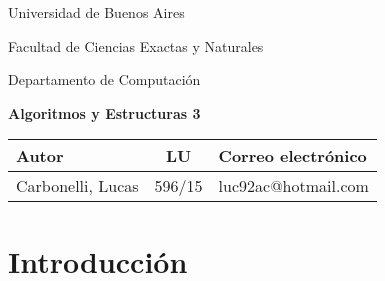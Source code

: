 \documentclass{article}
\begin{document}
\begin{titlepage}
	\centering
	\vspace{1cm}
	{\normalfont\huge Universidad de Buenos Aires \par}
	\vspace{1cm}
	{\normalfont\Large Facultad de Ciencias Exactas y Naturales\par}
	{\normalfont\Large Departamento de Computación\par}
	\vspace{1.5cm}
	{\bfseries\huge Algoritmos y Estructuras 3 \par}
	\vspace{1.5cm}
	{\normalfont\huge  \par}
	\vspace{1.5cm}
	
	{\large
		\begin{tabular}{l c l}
		Autor & LU & Correo electrónico \\
		\hline
		Carbonelli, Lucas 	& 596/15 & luc92ac@hotmail.com \\
		\end{tabular}
	}
	


\end{titlepage}

\newpage

\textbf{\tableofcontents{}}

\newpage

\section{Introducción}
\end{document}
